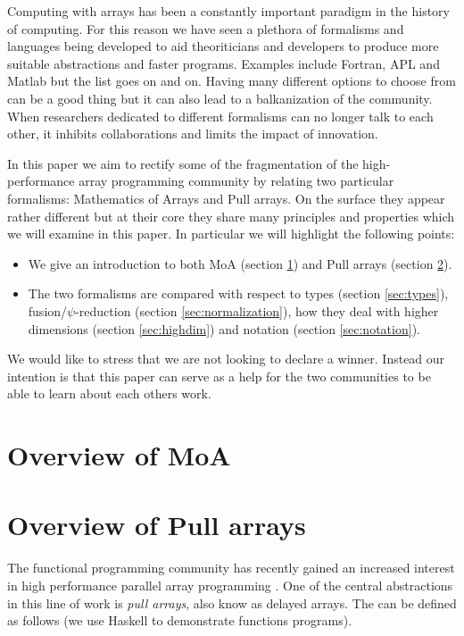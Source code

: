 \documentclass{sigplanconf}
\begin{document}
Computing with arrays has been a constantly important paradigm in the
history of computing. For this reason we have seen a plethora of
formalisms and languages being developed to aid theoriticians and
developers to produce more suitable abstractions and faster programs.
Examples include Fortran, APL and Matlab but the list goes on and on.
Having many different options to choose from can be a good thing but
it can also lead to a balkanization of the community. When researchers
dedicated to different formalisms can no longer talk to each other,  it
inhibits collaborations and limits the impact of innovation.

In this paper we aim to rectify some of the fragmentation of the
high-performance array programming community by relating two
particular formalisms: Mathematics of Arrays and Pull arrays. On the
surface they appear rather different but at their core they share many
principles and properties which we will examine in this paper. In
particular we will highlight the following points:
\begin{itemize}
\item We give an introduction to both MoA (section \ref{sec:moa}) and Pull
  arrays (section \ref{sec:pull}).
\item The two formalisms are compared with respect to types (section
  \ref{sec:types}), fusion/\(\psi\)-reduction (section
  \ref{sec:normalization}), 
  how they deal with higher dimensions (section \ref{sec:highdim})
  and notation (section \ref{sec:notation}).
\end{itemize}

We would like to stress that we are not looking to declare a
winner. Instead our intention is that this paper can serve as a help
for the two communities to be able to learn about each others work.

\section{Overview of MoA}
\label{sec:moa}

\section{Overview of Pull arrays}
\label{sec:pull}

The functional programming community has recently gained an increased
interest in high performance parallel array programming
\cite{keller2010regular,Axelsson:2010:Feldspar,Mainland:2010:Nikola,Svensson:2011:Obsidian,Claessen:2012:Expressive,Ankner:2013:AnEDSL,lippmeier2011efficient}. One
of the central abstractions in this line of work is \emph{pull
 arrays}, also know as delayed arrays. The can be defined as follows
(we use Haskell \cite{marlow2010haskell} to demonstrate functions
programs).
\end{document}
